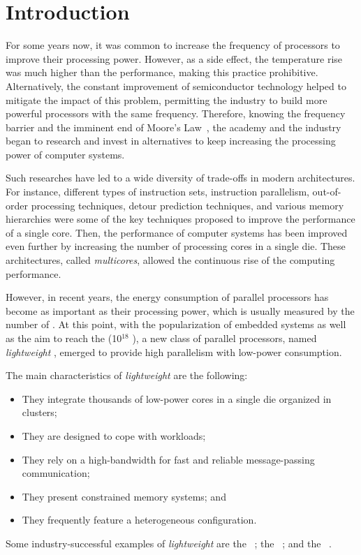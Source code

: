 \chapter{Introduction}
\label{ch.intro}

	For some years now, it was common to increase the frequency of processors
	to improve their processing power.
	However, as a side effect, the temperature rise was much higher than the
	performance, making this practice prohibitive.
	Alternatively, the constant improvement of semiconductor technology helped
	to mitigate the impact of this problem, permitting the industry to build
	more powerful processors with the same frequency.
	Therefore, knowing the frequency barrier and the imminent end of Moore's Law~\cite{moore:1965},
	the academy and the industry began to research and invest in alternatives
	to keep increasing the processing power of computer systems.

	Such researches have led to a wide diversity of trade-offs in modern architectures.
	For instance, different types of instruction sets, instruction parallelism,
	out-of-order processing techniques, detour prediction techniques, and various
	memory hierarchies were some of the key techniques proposed to improve the
	performance of a single core.
	Then, the performance of computer systems has been improved even further by
	increasing the number of processing cores in a single die.
	These architectures, called \textit{multicores}, allowed the continuous
	rise of the computing performance.

	However, in recent years, the energy consumption of parallel processors
	has become as important as their processing power, which is usually measured
	by the number of \flops.
	At this point, with the popularization of embedded systems as well as the aim
	to reach the \exascale (10$^{18}$ \flops), a new class of parallel processors,
	named \textit{lightweight} \manycores, emerged to provide high parallelism
	with low-power consumption.

	The main characteristics of  \textit{lightweight} \manycores are the following:
	\begin{itemize}
		\item They integrate thousands of low-power cores in a single die organized in clusters;
		\item They are designed to cope with \mimd workloads;
		\item They rely on a high-bandwidth \noc for fast and reliable message-passing communication;
		\item They present constrained memory systems; and
		\item They frequently feature a heterogeneous configuration.
	\end{itemize}
	Some industry-successful examples of \textit{lightweight} \manycores are
	the \mppa~\cite{DeDinechin2013-1};
	the \epiphany~\cite{olofsson2014}; and
	the \taihulight~\cite{zheng2015}.

